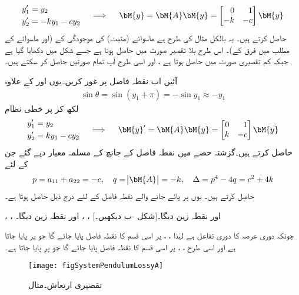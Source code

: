 \begin{gather}
\begin{aligned}
y_1'&=y_2\\
y_2'&=-ky_1 -cy_2
\end{aligned}\quad \implies \quad
\begin{aligned}
\bM{y}=\bM{A}\bM{y}=\begin{bmatrix*}[r] 0&1\\-k&-c \end{bmatrix*}\bM{y}
\end{aligned}
\end{gather}
 حاصل کرتے ہیں۔ یہ بالکل مثال  کی طرح ہے ماسوائے (مثبت)  کی موجودگی کے  (اور  ماسوائے  کے مطلب میں فرق کے)۔ اس طرح بلا تقصیر  صورت میں  حاصل ہوتا ہے جسے شکل  میں دکھایا گیا ہے جبکہ کم تقصیری صورت میں  حاصل ہوتا ہے ، اور اسی طرح آپ تمام صورتیں حاصل کر سکتے ہیں۔

آئیں اب نقطہ فاصل  پر غور کریں۔یوں  اور  کے علاوہ 
\begin{align*}
\sin \theta=\sin(y_1+\pi)=-\sin y_1\approx -y_1
\end{align*}
لکھ کر  پر خطی نظام
\begin{gather}
\begin{aligned}
y_1'&=y_2\\
y_2'&=ky_1-cy_2
\end{aligned}\quad \implies \quad
\begin{aligned}
\bM{y}'=\bM{A}\bM{y}=\begin{bmatrix*}[r] 0&1\\k&-c  \end{bmatrix*} \bM{y}
\end{aligned}
\end{gather}
حاصل کرتے ہیں۔گزشتہ حصے میں نقطہ فاصل کے جانچ کے مسلمہ معیار دیے گئے جن کے لئے 
\begin{align*}
p=a_{11}+a_{22}=-c, \quad q=\abs{\bM{A}}=-k, \quad \Delta=p^4-4q=c^2+4k
\end{align*}
حاصل کرتے ہیں۔ یوں  پر پائے جانے والے نقطہ فاصل کے لئے درج ذیل حاصل ہوتا ہے۔
\begin{itemize}
 ، ،  اور   نقطہ زین دیگا۔[شکل -ب دیکھیں۔]
 ، ،  اور  نقطہ زین دیگا۔
\end{itemize}
چونکہ  دوری عرصہ  کا دوری تفاعل ہے  لہٰذا ، ،  پر اسی قسم کا نقطہ فاصل پایا جائے گا جو  پر پایا جاتا ہے اور اسی طرح ، ،  پر اسی قسم کا نقطہ فاصل پایا جائے گا جو  پر پایا جاتا ہے۔ 
\begin{figure}
\centering
\texttt{[image: figSystemPendulumLossyA]}
\caption{تقصیری ارتعاش۔مثال }
\label{شکل_مثال_نظام_دھاگے_سے_لٹکی_کمیت_تقصیری}
\end{figure}

